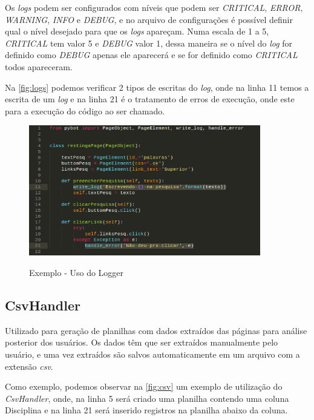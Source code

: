         Os \textit{logs} podem ser configurados com níveis que podem ser \textit{CRITICAL}, \textit{ERROR}, \textit{WARNING}, \textit{INFO} e \textit{DEBUG}, e no arquivo de configurações
        é possível definir qual o nível desejado para que os \textit{logs} apareçam. Numa escala de 1 a 5, \textit{CRITICAL} tem valor 5 e \textit{DEBUG} valor 1, dessa maneira se o nível
        do \textit{log} for definido como \textit{DEBUG} apenas ele aparecerá e se for definido como \textit{CRITICAL} todos apareceram.

        Na \autoref{fig:logs} podemos verificar 2 tipos de escritas do \textit{log}, onde na linha 11 temos a escrita de um \textit{log} e na linha 21 é o tratamento
        de erros de execução, onde este para a execução do código ao ser chamado.

        \begin{figure}[H]
            \vspace*{0,3cm}
            \centering
            \caption{Exemplo - Uso do Logger}
            \includegraphics[width=0.9\textwidth]{./04-figuras/logs}
            \label{fig:logs}
        \end{figure}


        \subsection{CsvHandler}
        Utilizado para geração de planilhas com dados extraídos das páginas para análise posterior dos usuários. Os dados têm que ser extraídos manualmente pelo
        usuário, e uma vez extraídos são salvos automaticamente em um arquivo com a extensão \textit{csv}.

        Como exemplo, podemos observar na \autoref{fig:csv} um exemplo de utilização do \textit{CsvHandler}, onde, na linha 5 será criado uma planilha contendo uma
        coluna Disciplina e na linha 21 será inserido registros na planilha abaixo da coluna.

